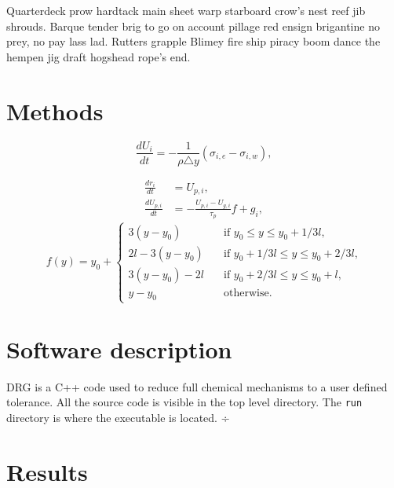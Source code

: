 \documentclass[preprint,12pt, a4paper]{elsarticle}
\begin{document}
Quarterdeck prow hardtack main sheet warp starboard crow's nest reef jib shrouds. Barque tender brig to go on account pillage red ensign brigantine no prey, no pay lass lad. Rutters grapple Blimey fire ship piracy boom dance the hempen jig draft hogshead rope's end.


\section{Methods} \label{s:methods}

%
\begin{equation}
    \frac{dU_i}{dt} =-\frac{1}{\rho\triangle
    y}\left(\sigma_{i,e}-\sigma_{i,w}\right),
    \label{e:viscousEvol}
\end{equation}
%

%
\begin{align}
    \frac{dr_{i}}{dt} & =U_{p,i}, \label{e:ppos}\\
    \frac{dU_{p,i}}{dt} & =-\frac{U_{p,i}-U_{g,i}}{\tau_{p}}f+g_{i}, \label{e:pmom}
\end{align}
%
%
\begin{equation}
    f\left(y\right) = y_0 + 
    \begin{cases} 
        3\left(y-y_0\right) & \quad \text{if $y_0\leq y \leq y_0+1/3l$,}\\
        2l-3\left(y-y_0\right) & \quad \text{if $y_0+1/3l\leq y \leq y_0+2/3l$,}\\
        3\left(y-y_0\right)-2l & \quad \text{if $y_0+2/3l\leq y \leq y_0+l$,}\\
        y-y_0 & \quad \text{otherwise.}
    \end{cases}
\end{equation}
%

\section{Software description}

DRG is a C++ code used to reduce full chemical mechanisms to a user defined tolerance. All the source code is visible in the top level directory. The \verb|run| directory is where the executable is located. 
÷


\section{Results} \label{s:results}
\end{document}
